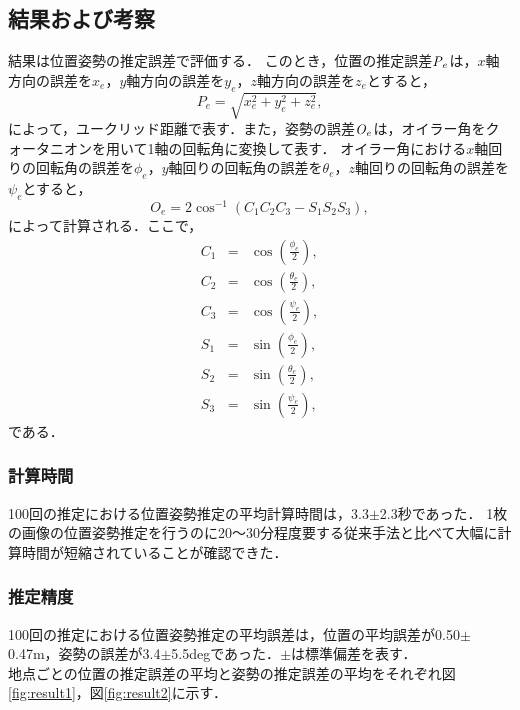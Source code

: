 \clearpage
\subsection{結果および考察}

結果は位置姿勢の推定誤差で評価する．
このとき，位置の推定誤差$\it{P}_e$は，$x$軸方向の誤差を$x_e$，$y$軸方向の誤差を$y_e$，$z$軸方向の誤差を$z_e$とすると，
\begin{equation}
P_e = \sqrt{x_e^2+y_e^2+z_e^2},
\end{equation}
によって，ユークリッド距離で表す．また，姿勢の誤差$\it{O}_e$は，オイラー角をクォータニオンを用いて1軸の回転角に変換して表す．
オイラー角における$x$軸回りの回転角の誤差を$\phi_e$，$y$軸回りの回転角の誤差を$\theta_e$，$z$軸回りの回転角の誤差を$\psi_e$とすると，
\begin{equation}
O_e = 2\cos^{-1}\left(C_1C_2C_3-S_1S_2S_3\right),
\end{equation}
によって計算される．ここで，
\begin{eqnarray}
  C_1 & = & \cos\left(\frac{\phi_e}{2}\right), \nonumber \\
  C_2 & = & \cos\left(\frac{\theta_e}{2}\right), \nonumber \\
  C_3 & = & \cos\left(\frac{\psi_e}{2}\right), \nonumber \\
  S_1 & = & \sin\left(\frac{\phi_e}{2}\right), \nonumber \\
  S_2 & = & \sin\left(\frac{\theta_e}{2}\right), \nonumber \\
  S_3 & = & \sin\left(\frac{\psi_e}{2}\right),
\end{eqnarray}
である．

\clearpage
\subsubsection*{計算時間}
100回の推定における位置姿勢推定の平均計算時間は，3.3$\pm$2.3秒であった．
1枚の画像の位置姿勢推定を行うのに20～30分程度要する従来手法\mbox{\cite{Goto2018}}と比べて大幅に計算時間が短縮されていることが確認できた．

\subsubsection*{推定精度}
100回の推定における位置姿勢推定の平均誤差は，位置の平均誤差が0.50$\pm$0.47m，姿勢の誤差が3.4$\pm$5.5degであった．$\pm$は標準偏差を表す．
\\

地点ごとの位置の推定誤差の平均と姿勢の推定誤差の平均をそれぞれ図\ref{fig:result1}，図\ref{fig:result2}に示す．
\\

